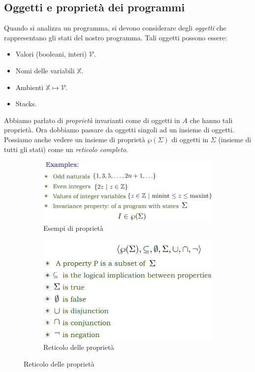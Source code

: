 \documentclass[a4paper,oneside,titlepage]{book}
\begin{document}
\subsection{Oggetti e proprietà dei programmi}
Quando si analizza un programma, si devono considerare degli \textit{oggetti} che rappresentano gli stati del nostro programma. Tali oggetti possono essere:
\begin{itemize}
    \item Valori (booleani, interi) $\mathcal{V}$.
    \item Nomi delle variabili $\mathbb{X}$.
    \item Ambienti $\mathbb{X} \mapsto \mathcal{V}$.
    \item Stacks.
\end{itemize}
Abbiamo parlato di \textit{proprietà} invarianti come di oggetti in $A$ che hanno tali proprietà. Ora dobbiamo passare da oggetti singoli ad un insieme di oggetti. Possiamo anche vedere un insieme di proprietà $\wp(\Sigma)$ di oggetti in $\Sigma$ (insieme di tutti gli stati) come un \textit{reticolo completo}.
\begin{figure}[htp]
	\begin{subfigure}{0.49\textwidth}
	    \centering
		\includegraphics[width=\textwidth, height=\textheight, keepaspectratio]{prop1.png}
		\caption{Esempi di proprietà}
	\end{subfigure}
	\hfill
	\begin{subfigure}{0.49\textwidth}
	    \centering
		\includegraphics[width=\textwidth, height=\textheight, keepaspectratio]{prop2.png} 
		\caption{Reticolo delle proprietà}
	\end{subfigure}
\end{figure}
\newpage
\end{document}
